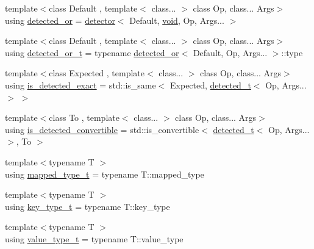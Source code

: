 \begin{DoxyCompactItemize}
\item 
{\footnotesize template$<$class Default , template$<$ class... $>$ class Op, class... Args$>$ }\\using \mbox{\hyperlink{namespacenlohmann_1_1detail_a240ce21919ab08e8a6cb3a5cfa412bce}{detected\+\_\+or}} = \mbox{\hyperlink{structnlohmann_1_1detail_1_1detector}{detector}}$<$ Default, \mbox{\hyperlink{namespacenlohmann_1_1detail_a59fca69799f6b9e366710cb9043aa77d}{void}}, Op, Args... $>$
\item 
{\footnotesize template$<$class Default , template$<$ class... $>$ class Op, class... Args$>$ }\\using \mbox{\hyperlink{namespacenlohmann_1_1detail_a7ac5b8ef0363101275a2827b3b117dcf}{detected\+\_\+or\+\_\+t}} = typename \mbox{\hyperlink{namespacenlohmann_1_1detail_a240ce21919ab08e8a6cb3a5cfa412bce}{detected\+\_\+or}}$<$ Default, Op, Args... $>$\+::type
\item 
{\footnotesize template$<$class Expected , template$<$ class... $>$ class Op, class... Args$>$ }\\using \mbox{\hyperlink{namespacenlohmann_1_1detail_a7542b4dbac07817fd4849ecfa4619def}{is\+\_\+detected\+\_\+exact}} = std\+::is\+\_\+same$<$ Expected, \mbox{\hyperlink{namespacenlohmann_1_1detail_a37e97a32d0b94ce5f745427e4e40204d}{detected\+\_\+t}}$<$ Op, Args... $>$ $>$
\item 
{\footnotesize template$<$class To , template$<$ class... $>$ class Op, class... Args$>$ }\\using \mbox{\hyperlink{namespacenlohmann_1_1detail_a5262e531c46e357b33007060f294673b}{is\+\_\+detected\+\_\+convertible}} = std\+::is\+\_\+convertible$<$ \mbox{\hyperlink{namespacenlohmann_1_1detail_a37e97a32d0b94ce5f745427e4e40204d}{detected\+\_\+t}}$<$ Op, Args... $>$, To $>$
\item 
{\footnotesize template$<$typename T $>$ }\\using \mbox{\hyperlink{namespacenlohmann_1_1detail_a9c1795c148875722f8482d39e0eb9364}{mapped\+\_\+type\+\_\+t}} = typename T\+::mapped\+\_\+type
\item 
{\footnotesize template$<$typename T $>$ }\\using \mbox{\hyperlink{namespacenlohmann_1_1detail_a66dfe39f03b05d6b7265a0ff748d64ef}{key\+\_\+type\+\_\+t}} = typename T\+::key\+\_\+type
\item 
{\footnotesize template$<$typename T $>$ }\\using \mbox{\hyperlink{namespacenlohmann_1_1detail_af91beae90c2fb0f931079b3d50a343bc}{value\+\_\+type\+\_\+t}} = typename T\+::value\+\_\+type

\end{DoxyCompactItemize}
